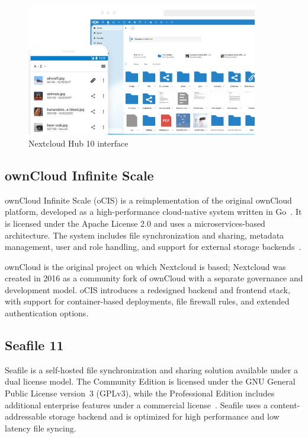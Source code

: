 \begin{figure}[H]
  \centering
  \includegraphics[width=0.9\textwidth]{imaxes/nextcloud-ui.png}
  \caption{Nextcloud Hub 10 interface}
  \label{fig:nextcloud-ui}
\end{figure}

\subsection*{ownCloud Infinite Scale}

ownCloud Infinite Scale (oCIS) is a reimplementation of the original ownCloud platform, developed as a high-performance cloud-native system written in Go~\cite{owncloud-docs}. It is licensed under the Apache License 2.0 and uses a microservices-based architecture. The system includes file synchronization and sharing, metadata management, user and role handling, and support for external storage backends~\cite{owncloud-news}.

ownCloud is the original project on which Nextcloud is based; Nextcloud was created in 2016 as a community fork of ownCloud with a separate governance and development model. oCIS introduces a redesigned backend and frontend stack, with support for container-based deployments, file firewall rules, and extended authentication options.

\subsection*{Seafile 11}

Seafile is a self-hosted file synchronization and sharing solution available under a dual license model. The Community Edition is licensed under the GNU General Public License version~3 (GPLv3), while the Professional Edition includes additional enterprise features under a commercial license~\cite{seafile-docs}. Seafile uses a content-addressable storage backend and is optimized for high performance and low latency file syncing.

